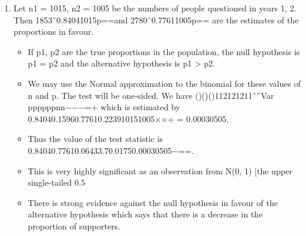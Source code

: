 \documentclass[a4paper,12pt]{article}
\begin{document}
\begin{enumerate}
\item Let n1 = 1015, n2 = 1005 be the numbers of people questioned in years 1, 2. Then 1853ˆ0.84041015p==and 2780ˆ0.77611005p== are the estimates of the proportions in favour.
\begin{itemize}
    \item If p1, p2 are the true proportions in the population, the null hypothesis is p1 = p2 and the alternative hypothesis is p1 > p2. 
    \item We may use the Normal approximation to the binomial for these values of n and p. The test will be one-sided.
We have
()()()112121211ˆˆVar ppppppnn−−−=+
which is estimated by 0.84040.15960.77610.223910151005××+ = 0.00030505.
\item Thus the value of the test statistic is
0.84040.77610.06433.70.01750.00030505−==.
\item This is very highly significant as an observation from N(0, 1) [the upper single-tailed 0.5%
\item There is strong evidence against the null hypothesis in favour of the alternative hypothesis which says that there is a decrease in the proportion of supporters.
\end{itemize}

\end{enumerate}
\end{document}
